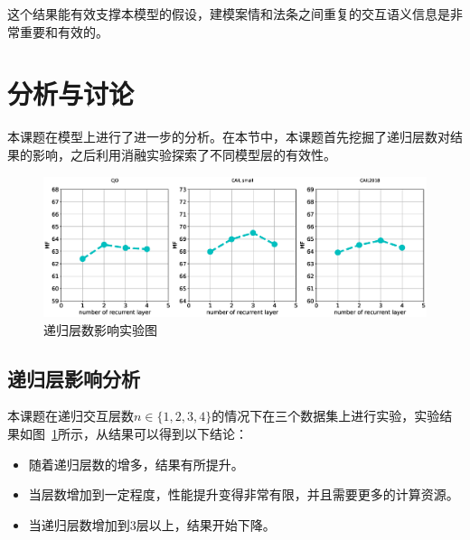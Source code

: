 这个结果能有效支撑本模型的假设，建模案情和法条之间重复的交互语义信息是非常重要和有效的。

\section{分析与讨论}
\label{sec:ran_analysis}
本课题在模型上进行了进一步的分析。在本节中，本课题首先挖掘了递归层数对结果的影响，之后利用消融实验探索了不同模型层的有效性。
\begin{figure}[hbtp]
    \centering
    \includegraphics[scale=0.39, clip=true]{./sources/ran_recurrent_layers.eps}
    \vspace{-10pt}
    \caption{\label{fig:n_layers} 递归层数影响实验图}
    \vspace{-5pt}
\end{figure}

\subsection{递归层影响分析}
本课题在递归交互层数$n \in \{1,2,3,4\}$的情况下在三个数据集上进行实验，实验结果如图~\ref{fig:n_layers}所示，从结果可以得到以下结论：
\begin{itemize}
    \item 随着递归层数的增多，结果有所提升。
    \item 当层数增加到一定程度，性能提升变得非常有限，并且需要更多的计算资源。
    \item 当递归层数增加到3层以上，结果开始下降。
\end{itemize}



